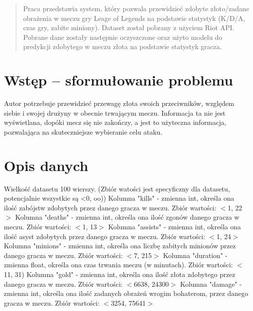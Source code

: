 \documentclass[10pt]{article}
\begin{document}


\begin{abstract}
Praca przedstawia system, który pozwala przewidzieć zdobyte złoto/zadane obrażenia w meczu gry Leage of Legends na podstawie statystyk (K/D/A, czas gry, zabite miniony). Dataset został pobrany z użyciem Riot API. Pobrane dane zostały następnie oczyszczone oraz użyto modelu do predykcji zdobytego w meczu złota na podstawie statystyk gracza.

\end{abstract}

\section{Wstęp -- sformułowanie problemu}
\label{sec:wstep}

Autor potrzebuje przewidzieć przewagę złota swoich przeciwników, względem siebie i swojej drużyny w obecnie trwającym meczu. Informacja ta nie jest wyświetlana, dopóki mecz się nie zakończy, a jest to użyteczna informacja, pozwalająca na skuteczniejsze wybieranie celu ataku.

\section{Opis danych}
Wielkość datasetu 100 wierszy. (Zbiór watości jest specyficzny dla datasetu, potencjalnie wszystkie są \textless0, oo))
\newline
Kolumna "kills" - zmienna int, określa ona ilość zabójstw zdobytych przez danego gracza w meczu. Zbiór wartości: $<$1, 22$>$
\newline
Kolumna "deaths" - zmienna int, określa ona ilość zgonów danego gracza w meczu.
\newline
Zbiór wartości: $<$1, 13$>$
\newline
Kolumna "assists" - zmienna int, określa ona ilość asyst zdobytych przez danego gracza w meczu. Zbiór wartości: $<$1, 24$>$
\newline
Kolumna "minions" - zmienna int, określa ona liczbę zabitych minionów przez danego gracza w meczu.
\newline
Zbiór wartości: $<$7, 215$>$
\newline
Kolumna "duration" - zmienna float, określa ona czas trwania meczu (w minutach).
\newline
Zbiór wartości: $<$11, 31)
\newline
Kolumna "gold" - zmienna int, określa ona ilość złota zdobytego przez danego gracza w meczu. Zbiór wartości: $<$6638, 24300$>$
\newline
Kolumna "damage" - zmienna int, określa ona ilość zadanych obrażeń wrogim bohaterom, przez danego gracza w meczu. Zbiór wartości: $<$3254, 75641$>$
\end{document}
